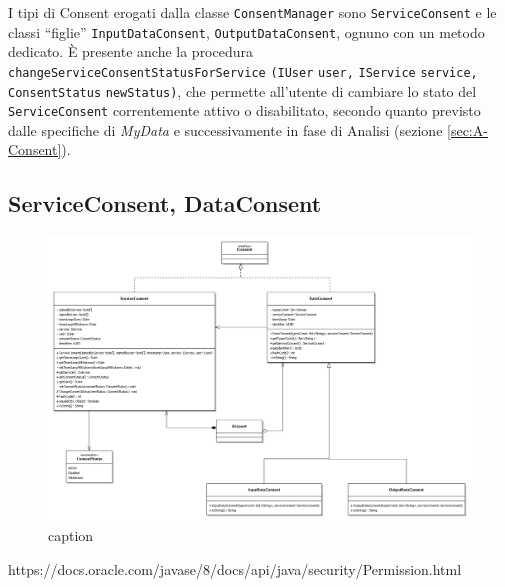 I tipi di Consent erogati dalla classe \texttt{ConsentManager} sono \texttt{ServiceConsent} e le classi “figlie” \texttt{InputDataConsent}, \texttt{OutputDataConsent}, ognuno con un metodo dedicato. \`E presente anche la procedura \texttt{changeServiceConsentStatusForService} \texttt{(IUser} \texttt{user,} \texttt{IService} \texttt{service,} \texttt{ConsentStatus} \texttt{newStatus)}, che permette all’utente di cambiare lo stato del \texttt{ServiceConsent} correntemente attivo o disabilitato, secondo quanto previsto dalle specifiche di \textit{MyData} e successivamente in fase di Analisi (sezione \ref{sec:A-Consent}).


\subsection{ServiceConsent, DataConsent}
\label{subsec:P-ServiceConsentDataConsent}
\begin{figure} [h]
	\includegraphics[width=\linewidth]{pictures/Auth-Consents.png}
	\caption{caption}
	\label{fig:Auth-Consents}
\end{figure}
https://docs.oracle.com/javase/8/docs/api/java/security/Permission.html

